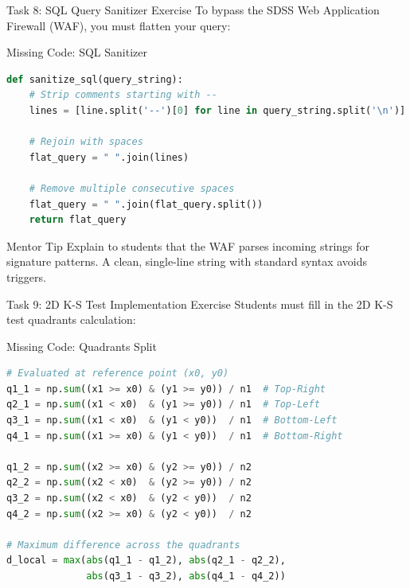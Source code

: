 \documentclass[9pt]{beamer}
\begin{document}
\begin{frame}[fragile]{Task 8: SQL Query Sanitizer Exercise}
  To bypass the SDSS Web Application Firewall (WAF), you must flatten your query:
  \begin{block}{Missing Code: SQL Sanitizer}
\begin{lstlisting}[language=Python,basicstyle=\tiny\ttfamily,keywordstyle=\color{blue}]
def sanitize_sql(query_string):
    # Strip comments starting with --
    lines = [line.split('--')[0] for line in query_string.split('\n')]
    
    # Rejoin with spaces
    flat_query = " ".join(lines)
    
    # Remove multiple consecutive spaces
    flat_query = " ".join(flat_query.split())
    return flat_query
\end{lstlisting}
  \end{block}
  \begin{exampleblock}{Mentor Tip}
    Explain to students that the WAF parses incoming strings for signature patterns. A clean, single-line string with standard syntax avoids triggers.
  \end{exampleblock}
\end{frame}

\begin{frame}[fragile]{Task 9: 2D K-S Test Implementation Exercise}
  Students must fill in the 2D K-S test quadrants calculation:
  \begin{block}{Missing Code: Quadrants Split}
\begin{lstlisting}[language=Python,basicstyle=\tiny\ttfamily,keywordstyle=\color{blue}]
# Evaluated at reference point (x0, y0)
q1_1 = np.sum((x1 >= x0) & (y1 >= y0)) / n1  # Top-Right
q2_1 = np.sum((x1 < x0)  & (y1 >= y0)) / n1  # Top-Left
q3_1 = np.sum((x1 < x0)  & (y1 < y0))  / n1  # Bottom-Left
q4_1 = np.sum((x1 >= x0) & (y1 < y0))  / n1  # Bottom-Right

q1_2 = np.sum((x2 >= x0) & (y2 >= y0)) / n2
q2_2 = np.sum((x2 < x0)  & (y2 >= y0)) / n2
q3_2 = np.sum((x2 < x0)  & (y2 < y0))  / n2
q4_2 = np.sum((x2 >= x0) & (y2 < y0))  / n2

# Maximum difference across the quadrants
d_local = max(abs(q1_1 - q1_2), abs(q2_1 - q2_2),
              abs(q3_1 - q3_2), abs(q4_1 - q4_2))
\end{lstlisting}
  \end{block}
\end{frame}
\end{document}
